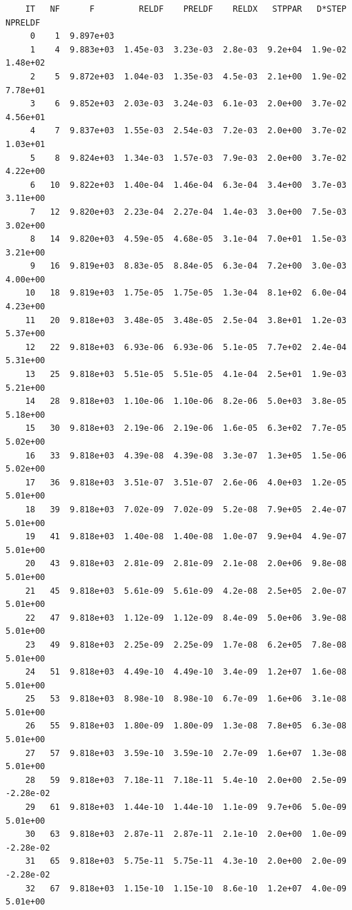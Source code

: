 \documentclass[11pt]{article}\usepackage[]{graphicx}\usepackage[]{color}
\makeatletter
\newenvironment{kframe}{%
 \def\at@end@of@kframe{}%
 \ifinner\ifhmode%
  \def\at@end@of@kframe{\end{minipage}}%
  \begin{minipage}{\columnwidth}%
 \fi\fi%
 \def\FrameCommand##1{\hskip\@totalleftmargin \hskip-\fboxsep
 \colorbox{shadecolor}{##1}\hskip-\fboxsep
     \hskip-\linewidth \hskip-\@totalleftmargin \hskip\columnwidth}%
 \MakeFramed {\advance\hsize-\width
   \@totalleftmargin\z@ \linewidth\hsize
   \@setminipage}}%
 {\par\unskip\endMakeFramed%
 \at@end@of@kframe}
\newenvironment{knitrout}{}{} %
\makeatother
\begin{document}
\begin{knitrout}
\begin{kframe}
\begin{verbatim}
    IT   NF      F         RELDF    PRELDF    RELDX   STPPAR   D*STEP   NPRELDF
     0    1  9.897e+03
     1    4  9.883e+03  1.45e-03  3.23e-03  2.8e-03  9.2e+04  1.9e-02  1.48e+02
     2    5  9.872e+03  1.04e-03  1.35e-03  4.5e-03  2.1e+00  1.9e-02  7.78e+01
     3    6  9.852e+03  2.03e-03  3.24e-03  6.1e-03  2.0e+00  3.7e-02  4.56e+01
     4    7  9.837e+03  1.55e-03  2.54e-03  7.2e-03  2.0e+00  3.7e-02  1.03e+01
     5    8  9.824e+03  1.34e-03  1.57e-03  7.9e-03  2.0e+00  3.7e-02  4.22e+00
     6   10  9.822e+03  1.40e-04  1.46e-04  6.3e-04  3.4e+00  3.7e-03  3.11e+00
     7   12  9.820e+03  2.23e-04  2.27e-04  1.4e-03  3.0e+00  7.5e-03  3.02e+00
     8   14  9.820e+03  4.59e-05  4.68e-05  3.1e-04  7.0e+01  1.5e-03  3.21e+00
     9   16  9.819e+03  8.83e-05  8.84e-05  6.3e-04  7.2e+00  3.0e-03  4.00e+00
    10   18  9.819e+03  1.75e-05  1.75e-05  1.3e-04  8.1e+02  6.0e-04  4.23e+00
    11   20  9.818e+03  3.48e-05  3.48e-05  2.5e-04  3.8e+01  1.2e-03  5.37e+00
    12   22  9.818e+03  6.93e-06  6.93e-06  5.1e-05  7.7e+02  2.4e-04  5.31e+00
    13   25  9.818e+03  5.51e-05  5.51e-05  4.1e-04  2.5e+01  1.9e-03  5.21e+00
    14   28  9.818e+03  1.10e-06  1.10e-06  8.2e-06  5.0e+03  3.8e-05  5.18e+00
    15   30  9.818e+03  2.19e-06  2.19e-06  1.6e-05  6.3e+02  7.7e-05  5.02e+00
    16   33  9.818e+03  4.39e-08  4.39e-08  3.3e-07  1.3e+05  1.5e-06  5.02e+00
    17   36  9.818e+03  3.51e-07  3.51e-07  2.6e-06  4.0e+03  1.2e-05  5.01e+00
    18   39  9.818e+03  7.02e-09  7.02e-09  5.2e-08  7.9e+05  2.4e-07  5.01e+00
    19   41  9.818e+03  1.40e-08  1.40e-08  1.0e-07  9.9e+04  4.9e-07  5.01e+00
    20   43  9.818e+03  2.81e-09  2.81e-09  2.1e-08  2.0e+06  9.8e-08  5.01e+00
    21   45  9.818e+03  5.61e-09  5.61e-09  4.2e-08  2.5e+05  2.0e-07  5.01e+00
    22   47  9.818e+03  1.12e-09  1.12e-09  8.4e-09  5.0e+06  3.9e-08  5.01e+00
    23   49  9.818e+03  2.25e-09  2.25e-09  1.7e-08  6.2e+05  7.8e-08  5.01e+00
    24   51  9.818e+03  4.49e-10  4.49e-10  3.4e-09  1.2e+07  1.6e-08  5.01e+00
    25   53  9.818e+03  8.98e-10  8.98e-10  6.7e-09  1.6e+06  3.1e-08  5.01e+00
    26   55  9.818e+03  1.80e-09  1.80e-09  1.3e-08  7.8e+05  6.3e-08  5.01e+00
    27   57  9.818e+03  3.59e-10  3.59e-10  2.7e-09  1.6e+07  1.3e-08  5.01e+00
    28   59  9.818e+03  7.18e-11  7.18e-11  5.4e-10  2.0e+00  2.5e-09 -2.28e-02
    29   61  9.818e+03  1.44e-10  1.44e-10  1.1e-09  9.7e+06  5.0e-09  5.01e+00
    30   63  9.818e+03  2.87e-11  2.87e-11  2.1e-10  2.0e+00  1.0e-09 -2.28e-02
    31   65  9.818e+03  5.75e-11  5.75e-11  4.3e-10  2.0e+00  2.0e-09 -2.28e-02
    32   67  9.818e+03  1.15e-10  1.15e-10  8.6e-10  1.2e+07  4.0e-09  5.01e+00

\end{verbatim}
\end{kframe}
\end{knitrout}
\end{document}

